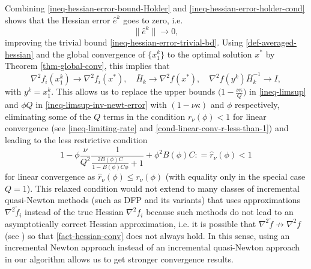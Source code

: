 \documentclass[final,numbook]{svjour3}
\begin{document}
\begin{remark}
Combining \eqref{ineq-hessian-error-bound-Holder} and \eqref{ineq-hessian-error-holder-cond} shows that the Hessian error $\widehat{e}^k$ goes to zero, i.e. 
    \begin{equation}\label{ineq-hessian-error-decay-to-zero} \| \widehat{e}^k \|  \to 0, 
    \end{equation}
improving the trivial bound \eqref{ineq-hessian-error-trivial-bd}. 
Using \eqref{def-averaged-hessian} and the global convergence of $\{x_1^k\}$ to the optimal solution $x^*$ by Theorem \ref{thm-global-conv}, this implies that
\begin{equation}\label{fact-hessian-conv}
\nabla^2 f_i(x_1^k) \to \nabla^2 f_i(x^*), \quad \bar{H}_k \to \nabla^2 f(x^*), \quad \nabla^2 f(y^k) \bar{H}_k^{-1} \to I,
\end{equation}
with $y^k=x_1^k$. This allows us to replace the upper bounds $\big(1 -  \frac{\nu\kappa}{Q}\big)$ in \eqref{ineq-limsup} and $\phi Q$ in \eqref{ineq-limsup-inv-newt-error} with $(1-\nu\kappa)$ and $\phi$ respectively, eliminating some of the $Q$ terms in the condition $r_\nu(\phi) < 1$ for linear convergence (see \eqref{ineq-limiting-rate} and \eqref{cond-linear-conv-r-less-than-1})  and leading to the less restrictive condition 
   $$ 1 - \phi \frac{\nu}{Q^2} \frac{1}{\frac{2B(\phi)C}{1-B(\phi)C\phi} + 1} + \phi^2 B(\phi)C : = \hat{r}_\nu(\phi) < 1 $$
for linear convergence as $\hat{r}_\nu(\phi) \leq r_\nu(\phi)$ (with equality only in the special case $Q=1$). This relaxed condition would not extend to many classes of incremental quasi-Newton methods (such as DFP and its variants) that uses approximations $\nabla^2 \tilde{f}_i$ instead of the true Hessian $\nabla^2 f_i$ because such methods do not lead to an asymptotically correct Hessian approximation, i.e. it is possible that $\nabla^2 \tilde{f} \not\to \nabla^2 f$ (see \cite[Section 4]{DennisMore74}) so that \eqref{fact-hessian-conv} does not always hold. In this sense, using an incremental Newton approach instead of an incremental quasi-Newton approach in our algorithm allows us to get stronger convergence results.    
\end{remark}
\end{document}
